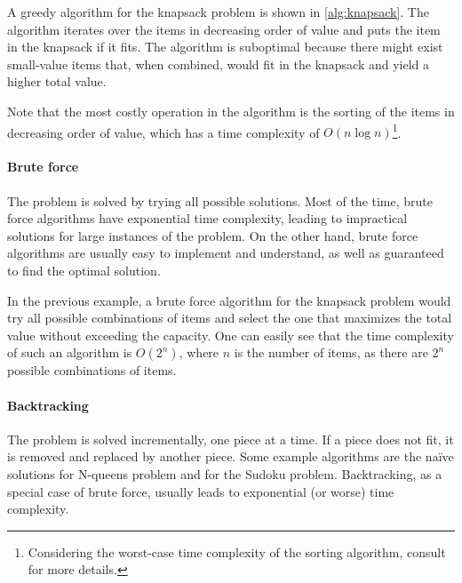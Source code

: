 A greedy algorithm for the knapsack problem is shown in \cref{alg:knapsack}.  The
algorithm iterates over the items in decreasing order of value and puts the item in the
knapsack if it fits.  The algorithm is suboptimal because there might exist small-value
items that, when combined, would fit in the knapsack and yield a higher total value.

Note that the most costly operation in the algorithm is the sorting of the items in
decreasing order of value, which has a time complexity of $O(n \log n)$\footnote{%
Considering the worst-case time complexity of the sorting algorithm, consult
\textcite{Cormen2022} for more details.}.

\paragraph{Brute force}  The problem is solved by trying all possible solutions.  Most of
the time, brute force algorithms have exponential time complexity, leading to impractical
solutions for large instances of the problem.  On the other hand, brute force algorithms
are usually easy to implement and understand, as well as guaranteed to find the optimal
solution.

In the previous example, a brute force algorithm for the knapsack problem would
try all possible combinations of items and select the one that maximizes the total value
without exceeding the capacity.  One can easily see that the time complexity of such an
algorithm is $O(2^n)$, where $n$ is the number of items, as there are $2^n$ possible
combinations of items.

\paragraph{Backtracking}  The problem is solved incrementally, one piece at a time.  If a
piece does not fit, it is removed and replaced by another piece.  Some example algorithms
are the naïve solutions for N-queens problem and for the Sudoku problem.  Backtracking, as
a special case of brute force, usually leads to exponential (or worse) time complexity.

